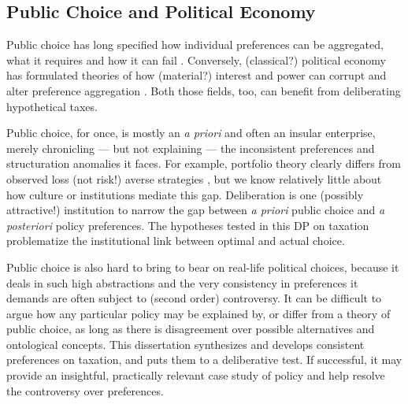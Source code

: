 
\subsection{Public Choice and Political Economy}
Public choice has long specified how individual preferences can be aggregated, what it requires and how it can fail \citep[for an overview,][]{Mueller}.
Conversely, (classical?) political economy has formulated theories of how (material?) interest and power can corrupt and alter preference aggregation \citep[for an overview,][]{Robbins1976}.
Both those fields, too, can benefit from deliberating hypothetical taxes.

Public choice, for once, is mostly an \emph{a priori} and often an insular enterprise, merely chronicling --- but not explaining --- the inconsistent preferences and structuration anomalies it faces.
For example, portfolio theory clearly differs from observed loss (not risk!) averse strategies \cite{Kahneman2011}, but we know relatively little about how culture or institutions mediate this gap.
Deliberation is one (possibly attractive!) institution to narrow the gap between \emph{a priori} public choice and \emph{a posteriori} policy preferences.
The hypotheses tested in this \gls{DP} on taxation problematize the institutional link between optimal and actual choice.

Public choice is also hard to bring to bear on real-life political choices, because it deals in such high abstractions and the very consistency in preferences it demands are often subject to (second order) controversy.
It can be difficult to argue how any particular policy may be explained by, or differ from a theory of public choice, as long as there is disagreement over possible alternatives and ontological concepts.
This dissertation synthesizes and develops consistent preferences on taxation, and puts them to a deliberative test.
If successful, it may provide an insightful, practically relevant case study of policy and help resolve the controversy over preferences.

